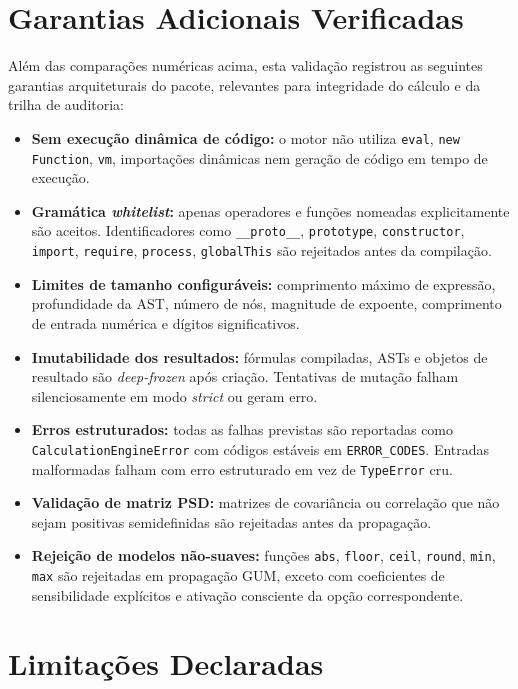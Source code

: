 \documentclass[11pt,a4paper]{article}
\begin{document}
\section{Garantias Adicionais Verificadas}

Além das comparações numéricas acima, esta validação registrou as seguintes garantias arquiteturais do pacote, relevantes para integridade do cálculo e da trilha de auditoria:

\begin{itemize}
  \item \textbf{Sem execução dinâmica de código:} o motor não utiliza \texttt{eval}, \texttt{new Function}, \texttt{vm}, importações dinâmicas nem geração de código em tempo de execução.
  \item \textbf{Gramática \emph{whitelist}:} apenas operadores e funções nomeadas explicitamente são aceitos. Identificadores como \texttt{\_\_proto\_\_}, \texttt{prototype}, \texttt{constructor}, \texttt{import}, \texttt{require}, \texttt{process}, \texttt{globalThis} são rejeitados antes da compilação.
  \item \textbf{Limites de tamanho configuráveis:} comprimento máximo de expressão, profundidade da AST, número de nós, magnitude de expoente, comprimento de entrada numérica e dígitos significativos.
  \item \textbf{Imutabilidade dos resultados:} fórmulas compiladas, ASTs e objetos de resultado são \emph{deep-frozen} após criação. Tentativas de mutação falham silenciosamente em modo \emph{strict} ou geram erro.
  \item \textbf{Erros estruturados:} todas as falhas previstas são reportadas como \texttt{CalculationEngineError} com códigos estáveis em \texttt{ERROR\_CODES}. Entradas malformadas falham com erro estruturado em vez de \texttt{TypeError} cru.
  \item \textbf{Validação de matriz PSD:} matrizes de covariância ou correlação que não sejam positivas semidefinidas são rejeitadas antes da propagação.
  \item \textbf{Rejeição de modelos não-suaves:} funções \texttt{abs}, \texttt{floor}, \texttt{ceil}, \texttt{round}, \texttt{min}, \texttt{max} são rejeitadas em propagação GUM, exceto com coeficientes de sensibilidade explícitos e ativação consciente da opção correspondente.
\end{itemize}

\section{Limitações Declaradas}
\end{document}
